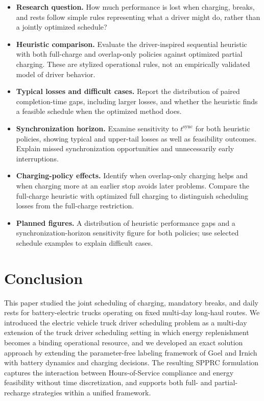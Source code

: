 \documentclass[3p,11pt,authoryear]{elsarticle}  %
\begin{document}
{\color{red}
\begin{itemize}
    \item \textbf{Research question.} How much performance is lost when charging, breaks, and rests follow simple rules representing what a driver might do, rather than a jointly optimized schedule?
    \item \textbf{Heuristic comparison.} Evaluate the driver-inspired sequential heuristic with both full-charge and overlap-only policies against optimized partial charging. These are stylized operational rules, not an empirically validated model of driver behavior.
    \item \textbf{Typical losses and difficult cases.} Report the distribution of paired completion-time gaps, including larger losses, and whether the heuristic finds a feasible schedule when the optimized method does.
    \item \textbf{Synchronization horizon.} Examine sensitivity to $t^{\mathrm{sync}}$ for both heuristic policies, showing typical and upper-tail losses as well as feasibility outcomes. Explain missed synchronization opportunities and unnecessarily early interruptions.
    \item \textbf{Charging-policy effects.} Identify when overlap-only charging helps and when charging more at an earlier stop avoids later problems. Compare the full-charge heuristic with optimized full charging to distinguish scheduling losses from the full-charge restriction.
    \item \textbf{Planned figures.} A distribution of heuristic performance gaps and a synchronization-horizon sensitivity figure for both policies; use selected schedule examples to explain difficult cases.
\end{itemize}
}


\section{Conclusion}

This paper studied the joint scheduling of charging, mandatory breaks, and daily rests for battery-electric trucks operating on fixed multi-day long-haul routes. We introduced the electric vehicle truck driver scheduling problem as a multi-day extension of the truck driver scheduling setting in which energy replenishment becomes a binding operational resource, and we developed an exact solution approach by extending the parameter-free labeling framework of Goel and Irnich with battery dynamics and charging decisions. The resulting SPPRC formulation captures the interaction between Hours-of-Service compliance and energy feasibility without time discretization, and supports both full- and partial-recharge strategies within a unified framework.
\end{document}
